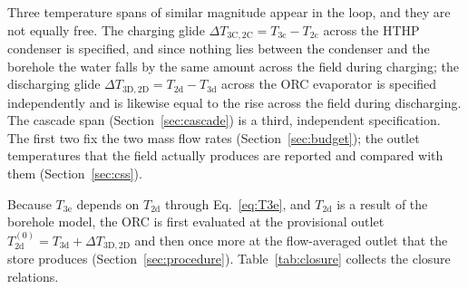 Three temperature spans of similar magnitude appear in the loop, and they are
not equally free. The charging glide $\Delta T_\mathrm{3C,2C}
=T_\mathrm{3c}-T_\mathrm{2c}$ across the HTHP condenser is specified, and
since nothing lies between the condenser and the borehole the water falls by
the same amount across the field during charging; the discharging glide
$\Delta T_\mathrm{3D,2D}=T_\mathrm{2d}-T_\mathrm{3d}$ across the ORC evaporator
is specified independently and is likewise equal to the rise across the field
during discharging. The cascade span (Section~\ref{sec:cascade}) is a third,
independent specification. The first two fix the two mass flow rates
(Section~\ref{sec:budget}); the outlet temperatures that the field actually
produces are reported and compared with them (Section~\ref{sec:css}).

Because $T_\mathrm{3e}$ depends on $T_\mathrm{2d}$ through
Eq.~\eqref{eq:T3e}, and $T_\mathrm{2d}$ is a result of the borehole model, the
ORC is first evaluated at the provisional outlet
$T_\mathrm{2d}^{(0)}=T_\mathrm{3d}+\Delta T_\mathrm{3D,2D}$ and then once more
at the flow-averaged outlet that the store produces
(Section~\ref{sec:procedure}). Table~\ref{tab:closure} collects the closure
relations.

\begin{table}[htbp]
\centering
\caption{Temperature closure of the ORC, HTHP and secondary-fluid loop.}
\label{tab:closure}
\small
{}
\end{table}

